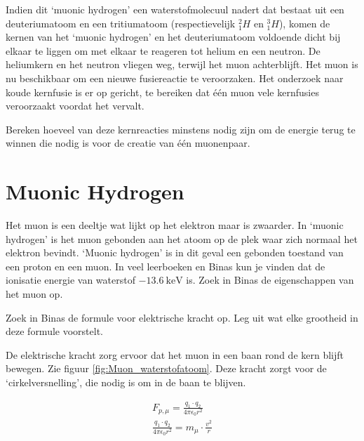 \begin{questions}
Indien dit `muonic hydrogen' een waterstofmolecuul nadert dat bestaat uit een
deuteriumatoom en een tritiumatoom (respectievelijk $^2_1H$ en $^3_1H$), komen de
kernen van het `muonic hydrogen' en het deuteriumatoom voldoende dicht bij elkaar
te liggen om met elkaar te reageren tot helium en een neutron. De
heliumkern en het neutron vliegen weg, terwijl het muon achterblijft.
Het muon is nu beschikbaar om een nieuwe fusiereactie te veroorzaken.
Het onderzoek naar koude kernfusie is er op gericht, te bereiken dat één
muon vele kernfusies veroorzaakt voordat het vervalt.

\question 

Bereken hoeveel van deze kernreacties minstens nodig zijn om de energie 
terug te winnen die nodig is voor de creatie van één muonenpaar.
\begin{solution} 
 
\end{solution} 

\section{Muonic Hydrogen}

Het muon is een deeltje wat lijkt op het elektron maar is zwaarder. 
In `muonic hydrogen' is het muon gebonden aan het atoom op de plek waar zich normaal het elektron bevindt.
`Muonic hydrogen' is in dit geval een gebonden toestand van een proton en een muon. 
In veel leerboeken en Binas kun je vinden dat de ionisatie energie van waterstof $\SI{-13,6}{\kilo\electronvolt}$ is.
\question
Zoek in Binas de eigenschappen van het muon op.

\question
Zoek in Binas de formule voor elektrische kracht op. Leg uit wat elke grootheid in deze
formule voorstelt.

\begin{solution} 
 
\end{solution} 

De elektrische kracht zorg ervoor dat het muon in een baan rond de kern blijft bewegen.
Zie figuur \ref{fig:Muon_waterstofatoom}.
Deze kracht zorgt voor de `cirkelversnelling', die nodig is om in de baan te blijven.

\begin{eqnarray} 
   \label{eq:krachten}
   F_{p,\mu} =\frac{q_1 \cdot q_2}{4\pi \epsilon_0 r^2} \\
   \label{eq:krachten2}
    \frac{q_1 \cdot q_2}{4\pi \epsilon_0 r^2} = m_{\mu} \cdot \frac{v^2}{r}    
\end{eqnarray}


\end{questions}
